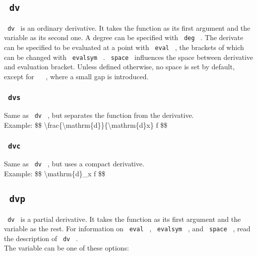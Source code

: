 \subsection{\texorpdfstring{\texttt{\ dv\ }}{ dv }}\label{dv}

\texttt{\ dv\ } is an ordinary derivative. It takes the function as its
first argument and the variable as its second one. A degree can be
specified with \texttt{\ deg\ } . The derivate can be specified to be
evaluated at a point with \texttt{\ eval\ } , the brackets of which can
be changed with \texttt{\ evalsym\ } . \texttt{\ space\ } influences the
space between derivative and evaluation bracket. Unless defined
otherwise, no space is set by default, except for
\texttt{\ \textbar{}\ } , where a small gap is introduced.

\subsubsection{\texorpdfstring{\texttt{\ dvs\ }}{ dvs }}\label{dvs}

Same as \texttt{\ dv\ } , but separates the function from the
derivative.\\
Example: \$\$
\textbackslash frac\{\textbackslash mathrm\{d\}\}\{\textbackslash mathrm\{d\}x\}
f \$\$

\subsubsection{\texorpdfstring{\texttt{\ dvc\ }}{ dvc }}\label{dvc}

Same as \texttt{\ dv\ } , but uses a compact derivative.\\
Example: \$\$ \textbackslash mathrm\{d\}\_x f \$\$

\subsection{\texorpdfstring{\texttt{\ dvp\ }}{ dvp }}\label{dvp}

\texttt{\ dv\ } is a partial derivative. It takes the function as its
first argument and the variable as the rest. For information on
\texttt{\ eval\ } , \texttt{\ evalsym\ } , and \texttt{\ space\ } , read
the description of \texttt{\ dv\ } .\\
The variable can be one of these options:

